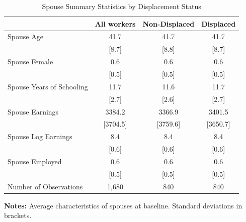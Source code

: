 \documentclass{article}
\begin{document}
\begin{table}[htbp] 
\centering 
\begin{threeparttable} 
\caption{Spouse Summary Statistics by Displacement Status} 

\centering
\begin{tabular}{llll}
\toprule
\multicolumn{1}{c}{} &
  \multicolumn{1}{r}{All workers} &
  \multicolumn{1}{r}{Non-Displaced} &
  \multicolumn{1}{r}{Displaced} \\
\midrule
\multicolumn{1}{l}{Spouse Age} &
  \multicolumn{1}{c}{41.7} &
  \multicolumn{1}{c}{41.7} &
  \multicolumn{1}{c}{41.7} \\
\multicolumn{1}{l}{} &
  \multicolumn{1}{c}{[8.7]} &
  \multicolumn{1}{c}{[8.8]} &
  \multicolumn{1}{c}{[8.7]} \\
\multicolumn{1}{l}{Spouse Female} &
  \multicolumn{1}{c}{0.6} &
  \multicolumn{1}{c}{0.6} &
  \multicolumn{1}{c}{0.6} \\
\multicolumn{1}{l}{} &
  \multicolumn{1}{c}{[0.5]} &
  \multicolumn{1}{c}{[0.5]} &
  \multicolumn{1}{c}{[0.5]} \\
\multicolumn{1}{l}{Spouse Years of Schooling} &
  \multicolumn{1}{c}{11.7} &
  \multicolumn{1}{c}{11.6} &
  \multicolumn{1}{c}{11.7} \\
\multicolumn{1}{l}{} &
  \multicolumn{1}{c}{[2.7]} &
  \multicolumn{1}{c}{[2.6]} &
  \multicolumn{1}{c}{[2.7]} \\
\multicolumn{1}{l}{Spouse Earnings} &
  \multicolumn{1}{c}{3384.2} &
  \multicolumn{1}{c}{3366.9} &
  \multicolumn{1}{c}{3401.5} \\
\multicolumn{1}{l}{} &
  \multicolumn{1}{c}{[3704.5]} &
  \multicolumn{1}{c}{[3759.6]} &
  \multicolumn{1}{c}{[3650.7]} \\
\multicolumn{1}{l}{Spouse Log Earnings} &
  \multicolumn{1}{c}{8.4} &
  \multicolumn{1}{c}{8.4} &
  \multicolumn{1}{c}{8.4} \\
\multicolumn{1}{l}{} &
  \multicolumn{1}{c}{[0.6]} &
  \multicolumn{1}{c}{[0.6]} &
  \multicolumn{1}{c}{[0.6]} \\
\multicolumn{1}{l}{Spouse Employed} &
  \multicolumn{1}{c}{0.6} &
  \multicolumn{1}{c}{0.6} &
  \multicolumn{1}{c}{0.6} \\
\multicolumn{1}{l}{} &
  \multicolumn{1}{c}{[0.5]} &
  \multicolumn{1}{c}{[0.5]} &
  \multicolumn{1}{c}{[0.5]} \\
\midrule
\multicolumn{1}{l}{Number of Observations} &
  \multicolumn{1}{c}{1,680} &
  \multicolumn{1}{c}{840} &
  \multicolumn{1}{c}{840} \\
\bottomrule
\end{tabular}

 \footnotesize  
\textbf{Notes:} Average characteristics of spouses at baseline. Standard deviations in brackets. 
\end{threeparttable} 
\end{table}
\end{document}
